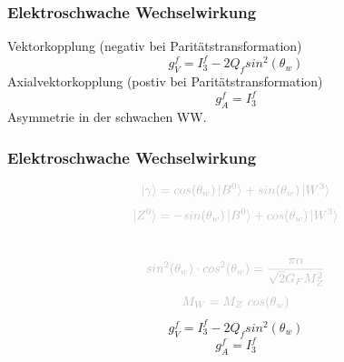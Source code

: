 \begin{frame}
	\begin{center}
	\frametitle{Elektroschwache Wechselwirkung}
	Vektorkopplung (negativ bei Paritätstransformation)
	\begin{equation*}
	g_V^f = I^f_3-2 Q_f sin^2(\theta_w)
	\end{equation*}
	Axialvektorkopplung (postiv bei Paritätstransformation)
	\begin{equation*}
	g_A^f = I^f_3
	\end{equation*}
	Asymmetrie in der schwachen WW.
	\end{center}
\end{frame}

\begin{frame}
	\frametitle{Elektroschwache Wechselwirkung}
	\begin{center}
		\begin{equation*}
		\textcolor{lightgray}{\ket{\gamma} =  cos(\theta_w)\ket{B^0} + sin(\theta_w) \ket{W^3}}
		\end{equation*}
		\begin{equation*}
		\textcolor{lightgray}{\ket{Z^0} = -sin(\theta_w) \ket{B^0} + cos(\theta_w) \ket{W^3}}
		\end{equation*}
		\\
		\begin{equation*}
		\textcolor{lightgray}{sin^2(\theta_w)\cdot cos^2(\theta_w) = \frac{\pi\alpha}{\sqrt{2}G_FM_Z^2}}
		\end{equation*}
		\begin{equation*}
		\textcolor{lightgray}{M_W = M_Z~cos(\theta_w)}
		\end{equation*}
		\begin{equation*}
		g_V^f = I^f_3-2 Q_f sin^2(\theta_w)
		\end{equation*}
		\begin{equation*}
		g_A^f = I^f_3
		\end{equation*}
	\end{center}
\end{frame}

